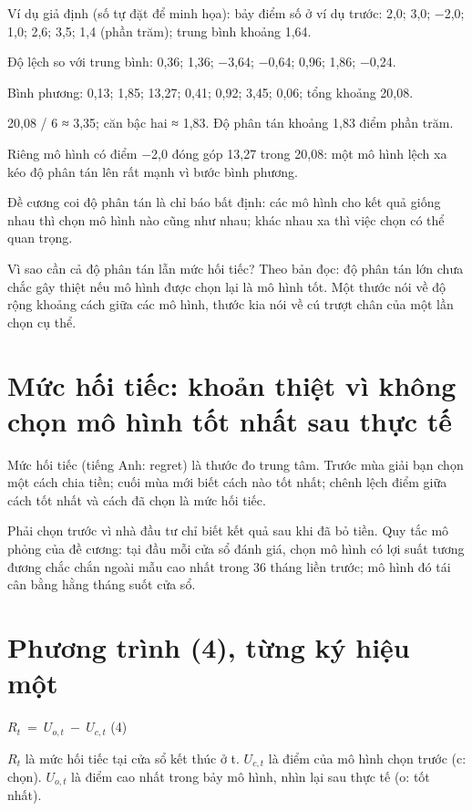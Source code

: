 \begin{tcolorbox}[breakable]
Ví dụ giả định (số tự đặt để minh họa): bảy điểm số ở ví dụ trước: 2,0; 3,0; −2,0; 1,0; 2,6; 3,5; 1,4 (phần trăm); trung bình khoảng 1,64.

Độ lệch so với trung bình: 0,36; 1,36; −3,64; −0,64; 0,96; 1,86; −0,24.

Bình phương: 0,13; 1,85; 13,27; 0,41; 0,92; 3,45; 0,06; tổng khoảng 20,08.

20,08 / 6 ≈ 3,35; căn bậc hai ≈ 1,83. Độ phân tán khoảng 1,83 điểm phần trăm.

Riêng mô hình có điểm −2,0 đóng góp 13,27 trong 20,08: một mô hình lệch xa kéo độ phân tán lên rất mạnh vì bước bình phương.
\end{tcolorbox}

Đề cương coi độ phân tán là chỉ báo bất định: các mô hình cho kết quả giống nhau thì chọn mô hình nào cũng như nhau; khác nhau xa thì việc chọn có thể quan trọng.

Vì sao cần cả độ phân tán lẫn mức hối tiếc? Theo bản đọc: độ phân tán lớn chưa chắc gây thiệt nếu mô hình được chọn lại là mô hình tốt. Một thước nói về độ rộng khoảng cách giữa các mô hình, thước kia nói về cú trượt chân của một lần chọn cụ thể.

\section{Mức hối tiếc: khoản thiệt vì không chọn mô hình tốt nhất sau thực tế}

Mức hối tiếc (tiếng Anh: regret) là thước đo trung tâm. Trước mùa giải bạn chọn một cách chia tiền; cuối mùa mới biết cách nào tốt nhất; chênh lệch điểm giữa cách tốt nhất và cách đã chọn là mức hối tiếc.

Phải chọn trước vì nhà đầu tư chỉ biết kết quả sau khi đã bỏ tiền. Quy tắc mô phỏng của đề cương: tại đầu mỗi cửa sổ đánh giá, chọn mô hình có lợi suất tương đương chắc chắn ngoài mẫu cao nhất trong 36 tháng liền trước; mô hình đó tái cân bằng hằng tháng suốt cửa sổ.

\section{Phương trình (4), từng ký hiệu một}

\(R_{t}\  = \ U_{o,t}\  - \ U_{c,t}\) (4)

\(R_{t}\) là mức hối tiếc tại cửa sổ kết thúc ở t. \(U_{c,t}\) là điểm của mô hình chọn trước (c: chọn). \(U_{o,t}\) là điểm cao nhất trong bảy mô hình, nhìn lại sau thực tế (o: tốt nhất).

